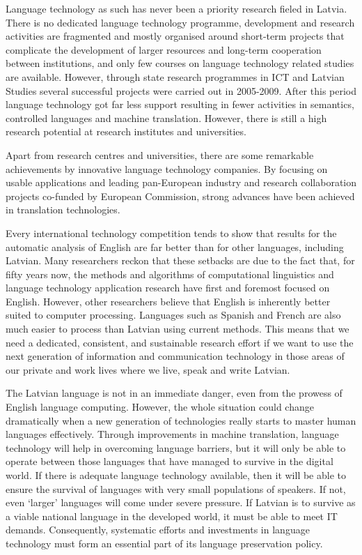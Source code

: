 \begin{multicols}{2}
Language technology as such has never been a priority research fieled in Latvia.
There is no dedicated language technology programme, development and research activities are fragmented and mostly organised around short-term projects that complicate the development of larger resources and long-term cooperation between institutions, and only few courses on language technology related studies are available.
However, through state research programmes in ICT and Latvian Studies several successful projects were carried out in 2005-2009.
After this period language technology got far less support resulting in fewer activities in semantics, controlled languages and machine translation.
However, there is still a high research potential at research institutes and universities. 

Apart from research centres and universities, there are some remarkable achievements by innovative language technology companies.
By focusing on usable applications and leading pan-European industry and research collaboration projects co-funded by European Commission, strong advances have been achieved in translation technologies.

Every international technology competition tends to show that results for the automatic analysis of English are far better than for other languages, including Latvian.
Many researchers reckon that these setbacks are due to the fact that, for fifty years now, the methods and algorithms of computational linguistics and language technology application research have first and foremost focused on English.
However, other researchers believe that English is inherently better suited to computer processing.
Languages such as Spanish and French are also much easier to process than Latvian using current methods.
This means that we need a dedicated, consistent, and sustainable research effort if we want to use the next generation of information and communication technology in those areas of our private and work lives where we live, speak and write Latvian.

The Latvian language is not in an immediate danger, even from the prowess of English language computing.
However, the whole situation could change dramatically when a new generation of technologies really starts to master human languages effectively.
Through improvements in machine translation, language technology will help in overcoming language barriers, but it will only be able to operate between those languages that have managed to survive in the digital world.
If there is adequate language technology available, then it will be able to ensure the survival of languages with very small populations of speakers.
If not, even ‘larger’ languages will come under severe pressure.
If Latvian is to survive as a viable national language in the developed world, it must be able to meet IT demands.
Consequently, systematic efforts and investments in language technology must form an essential part of its language preservation policy.
\end{multicols}

